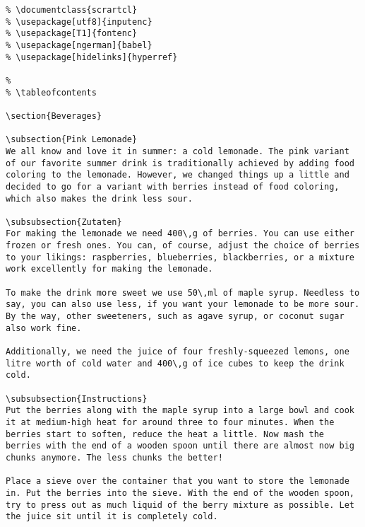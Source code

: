 \begin{verbatim}
% \documentclass{scrartcl}
% \usepackage[utf8]{inputenc}
% \usepackage[T1]{fontenc}
% \usepackage[ngerman]{babel}
% \usepackage[hidelinks]{hyperref}
	
% 
% \tableofcontents
	
\section{Beverages}
	
\subsection{Pink Lemonade}
We all know and love it in summer: a cold lemonade. The pink variant of our favorite summer drink is traditionally achieved by adding food coloring to the lemonade. However, we changed things up a little and decided to go for a variant with berries instead of food coloring, which also makes the drink less sour.
	
\subsubsection{Zutaten}
For making the lemonade we need 400\,g of berries. You can use either frozen or fresh ones. You can, of course, adjust the choice of berries to your likings: raspberries, blueberries, blackberries, or a mixture work excellently for making the lemonade.

To make the drink more sweet we use 50\,ml of maple syrup. Needless to say, you can also use less, if you want your lemonade to be more sour. By the way, other sweeteners, such as agave syrup, or coconut sugar also work fine.

Additionally, we need the juice of four freshly-squeezed lemons, one litre worth of cold water and 400\,g of ice cubes to keep the drink cold.
	
\subsubsection{Instructions}
Put the berries along with the maple syrup into a large bowl and cook it at medium-high heat for around three to four minutes. When the berries start to soften, reduce the heat a little. Now mash the berries with the end of a wooden spoon until there are almost now big chunks anymore. The less chunks the better!
	
Place a sieve over the container that you want to store the lemonade in. Put the berries into the sieve. With the end of the wooden spoon, try to press out as much liquid of the berry mixture as possible. Let the juice sit until it is completely cold.
	

\end{verbatim}
